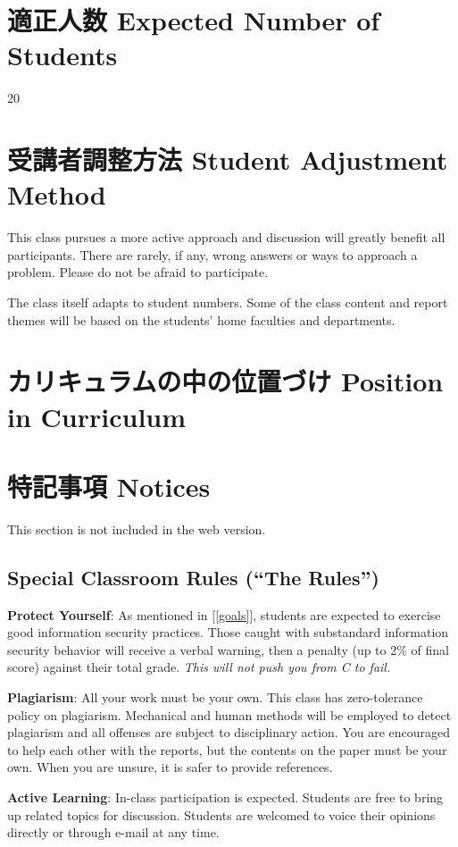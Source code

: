 \documentclass{article}
\begin{document}
\section{適正人数 Expected Number of Students}
20

\section{受講者調整方法 Student Adjustment Method}
This class pursues a more active approach and discussion will greatly benefit all participants. There are rarely, if any, wrong answers or ways to approach a problem. Please do not be afraid to participate.

The class itself adapts to student numbers. Some of the class content and report themes will be based on the students' home faculties and departments.

\section{カリキュラムの中の位置づけ Position in Curriculum}
\section{特記事項 Notices}
This section is not included in the web version.

\subsection{Special Classroom Rules (``The Rules'')}

\textbf{Protect Yourself}: As mentioned in [\ref{goals}], students are expected to exercise good information security practices. Those caught with substandard information security behavior will receive a verbal warning, then a penalty (up to 2\% of final score) against their total grade. \textit{This will not push you from C to fail.}

\smallskip\noindent
\textbf{Plagiarism}: All your work must be your own. This class has zero-tolerance policy on plagiarism. Mechanical and human methods will be employed to detect plagiarism and all offenses are subject to disciplinary action. You are encouraged to help each other with the reports, but the contents on the paper must be your own. When you are unsure, it is safer to provide references.

\smallskip\noindent
\textbf{Active Learning}: In-class participation is expected. Students are free to bring up related topics for discussion. Students are welcomed to voice their opinions directly or through e-mail at any time.
\end{document}
